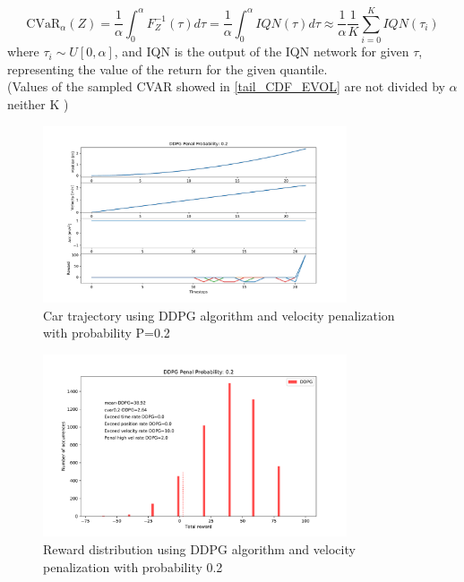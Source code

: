 \begin{equation}
        \text{CVaR}_\alpha (Z) = \frac{1}{\alpha} \int_{0}^{\alpha} F^{-1}_Z(\tau) d\tau=\frac{1}{\alpha} \int_{0}^{\alpha} IQN(\tau) d\tau \approx 
        \frac{1}{\alpha} \frac{1}{K}\sum_{i=0}^K IQN(\tau_i) 
\end{equation}
where $\tau_i \sim U[0,\alpha]$, and IQN is the output of the IQN network for given $\tau$, representing the
value of the return for the given quantile.\\
(Values of the sampled CVAR showed in \ref{tail_CDF_EVOL} are not divided by $\alpha$ neither K )
\begin{figure}[ht]
        \centering
        \includegraphics[width=0.8\textwidth]{images/DDPG/Trajectory_DDPG_ppenal02.pdf}
        \caption{Car trajectory using DDPG algorithm and velocity penalization with
        probability P=0.2}
        \label{traj_ddpg_probpenal0.2}
    
\end{figure}
\begin{figure}[ht]
        \centering
        \includegraphics[width=0.8\textwidth]{images/DDPG/Rewards_DDPG_ppenal02.pdf}
        \caption{Reward distribution using DDPG algorithm and velocity penalization with probability 0.2}
        \label{rew_ddpg_probpenal0.2}
    
\end{figure}


